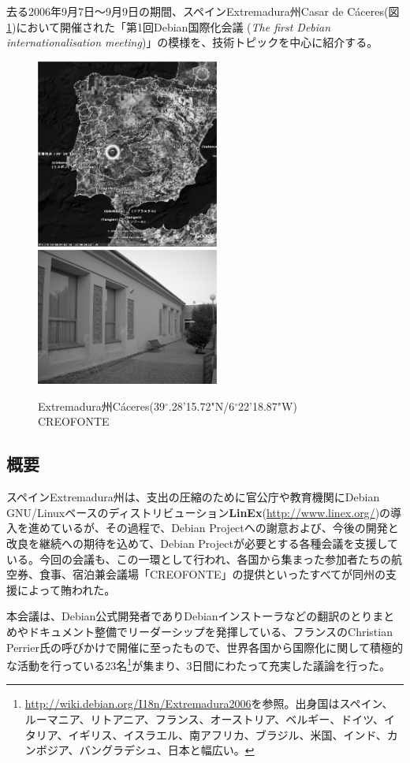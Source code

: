 \documentclass[mingoth,a4paper]{jsarticle}
\begin{document}
去る2006年9月7日〜9月9日の期間、スペインExtremadura州Casar de C\'{a}ceres(図\ref{fig:casar})において開催された「第1回Debian国際化会議 (\emph{The first Debian internationalisation meeting})」の模様を、技術トピックを中心に紹介する。

\begin{figure}[htbp]
  \begin{center}
    \includegraphics[width=6cm]{image200610/cesar.eps}
    \includegraphics[width=6cm]{image200610/creofonte.eps}
  \end{center}
  \caption{Extremadura州C\'{a}ceres(39$^{\circ}$.28'15.72"N/6$^{\circ}$22'18.87"W) CREOFONTE}
  \label{fig:casar}
\end{figure}

\subsection{概要}
\label{sec:extremadura-abstract}

スペインExtremadura州は、支出の圧縮のために官公庁や教育機関にDebian GNU/Linuxベースのディストリビューション\textbf{LinEx}(\url{http://www.linex.org/})の導入を進めているが、その過程で、Debian Projectへの謝意および、今後の開発と改良を継続への期待を込めて、Debian Projectが必要とする各種会議を支援している。今回の会議も、この一環として行われ、各国から集まった参加者たちの航空券、食事、宿泊兼会議場「CREOFONTE」の提供といったすべてが同州の支援によって賄われた。

本会議は、Debian公式開発者でありDebianインストーラなどの翻訳のとりまとめやドキュメント整備でリーダーシップを発揮している、フランスのChristian Perrier氏の呼びかけで開催に至ったもので、世界各国から国際化に関して積極的な活動を行っている23名\footnote{\url{http://wiki.debian.org/I18n/Extremadura2006}を参照。出身国はスペイン、ルーマニア、リトアニア、フランス、オーストリア、ベルギー、ドイツ、イタリア、イギリス、イスラエル、南アフリカ、ブラジル、米国、インド、カンボジア、バングラデシュ、日本と幅広い。}が集まり、3日間にわたって充実した議論を行った。
\end{document}
